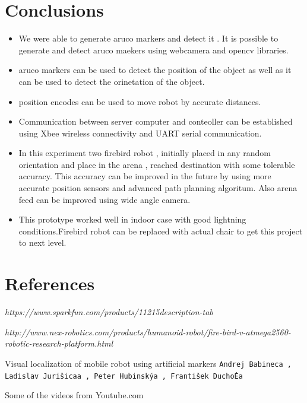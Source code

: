 \documentclass[]{exam}
\begin{document}
\section{\color{red} Conclusions }

\begin{itemize}
\item We were able to generate aruco markers and detect it . It is possible to generate and detect aruco maekers using webcamera and opencv libraries. 
\item aruco markers can be used to detect the position of the object as well as it can be used to detect the orinetation of the object. 
\item position encodes can be used to move robot by accurate distances. 
\item Communication between server computer and conteoller can be established using Xbee wireless connectivity and UART serial communication. 
\item In this experiment two firebird robot , initially placed in any random orientation and place in the arena , reached destination with some tolerable accuracy. This accuracy can be improved in the future by using more accurate position sensors and advanced path planning algoritum. Also arena feed can be improved using wide angle camera. 
\item This prototype worked well in indoor case with good lightning conditions.Firebird robot can be replaced with actual chair to get this project to next level. 
\end{itemize}
\section{\color{red} References  }
\begin{thebibliography}{9}

\textit{https://www.sparkfun.com/products/11215description-tab}

 

\textit{http://www.nex-robotics.com/products/humanoid-robot/fire-bird-v-atmega2560-robotic-research-platform.html}

 
Visual localization of mobile robot using artificial markers
\texttt{Andrej Babineca
, Ladislav Jurišicaa
, Peter Hubinskýa
, František DuchoĖa}

Some of the videos from Youtube.com 
\end{thebibliography}

\hrulefill
\end{document}
